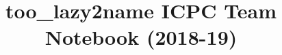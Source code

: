 \documentclass[12pt]{article}
\title{\vspace{-4ex}\Large{too\_lazy2name ICPC Team Notebook (2018-19)}}
\author{}
\date{}
\begin{document}
	\begin{landscape}
		\begin{multicols}{2}
			
			\maketitle
			\vspace{-13ex}
			\tableofcontents
			\pagestyle{fancy}
			
			
			
		\end{multicols}
	\end{landscape}
\end{document}
